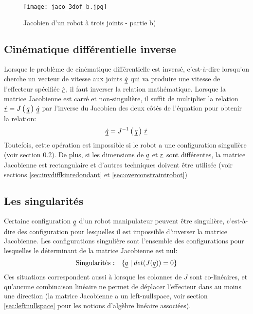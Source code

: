 \begin{figure}[H]
	\centering
		\texttt{[image: jaco\_3dof\_b.jpg]}
	\caption{Jacobien d'un robot à trois joints - partie b)}
	\label{fig:jaco_3dof_b}
\end{figure}



\subsection{Cinématique différentielle inverse}

Lorsque le problème de cinématique différentielle est inversé, c'est-à-dire lorsqu'on cherche un vecteur de vitesse aux joints $\underline{\dot{q}}$ qui va produire une vitesse de l'effecteur spécifiée $\underline{\dot{r}}$, il faut inverser la relation mathématique. Lorsque la matrice Jacobienne est carré et non-singulière, il suffit de multiplier la relation $\underline{\dot{r}} = J\left( \, \underline{q} \, \right) \, \underline{\dot{q}}$ par l'inverse du Jacobien des deux côtés de l'équation pour obtenir la relation:
%
\begin{align}
\underline{\dot{q}} = J^{-1}\left( \, \underline{q} \, \right) \, \underline{\dot{r}}
\end{align} 
%
Toutefois, cette opération est impossible si le robot a une configuration singulière (voir section \ref{sec:singu}). De plus, si les dimensions de $\underline{q}$ et $\underline{r}$ sont différentes, la matrice Jacobienne est rectangulaire et d'autres techniques doivent être utilisée (voir sections \ref{sec:invdiffkinredondant} et \ref{sec:overconstraintrobot})


\subsection{Les singularités}
\label{sec:singu}
Certaine configuration $\underline{q}$ d'un robot manipulateur peuvent être singulière, c'est-à-dire des configuration pour lesquelles il est impossible d'inverser la matrice Jacobienne. Les configurations singulière sont l'ensemble des configurations pour lesquelles le déterminant de la matrice Jacobienne est nul:
\begin{align}
\text{Singularités :} \quad \{  \underline{q} \; | \; det(J(\underline{q})) = 0 \}
\end{align} 
Ces situations correspondent aussi à lorsque les colonnes de $J$ sont co-linéaires, et qu'aucune combinaison linéaire ne permet de déplacer l'effecteur dans au moins une direction (la matrice Jacobienne a un left-nullspace, voir section \ref{sec:leftnullspace} pour les notions d'algèbre linéaire associées). 


